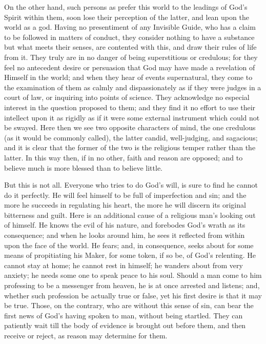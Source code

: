 On the other hand, such persons as prefer this world to the
leadings of God's Spirit within them, soon lose their perception of
the latter, and lean upon the world as a god. Having no presentiment
of any Invisible Guide, who has a claim to be followed in matters of
conduct, they consider nothing to have a substance but what meets
their senses, are contented with this, and draw their rules of life
from it. They truly are in no danger of being superstitious or
credulous; for they feel no antecedent desire or persuasion that God
may have made a revelation of Himself in the world; and when they hear
of events supernatural, they come to the examination of them as calmly
and dispassionately as if they were judges in a court of law, or
inquiring into points of science. They acknowledge no especial interest in the question proposed to them; and they find it no effort
to use their intellect upon it as rigidly as if it were some external
instrument which could not be swayed. Here then we see two opposite
characters of mind, the one credulous (as it would be commonly
called), the latter candid, well-judging, and sagacious; and it is
clear that the former of the two is the religious temper rather than
the latter. In this way then, if in no other, faith and reason are
opposed; and to believe much is more blessed than to believe little.

But this is not all. Everyone who tries to do God's will, is sure
to find he cannot do it perfectly. He will feel himself to be full of
imperfection and sin; and the more he succeeds in regulating his
heart, the more he will discern its original bitterness and guilt.
Here is an additional cause of a religious man's looking out of
himself. He knows the evil of his nature, and forebodes God's wrath as
its consequence; and when he looks around him, he sees it reflected
from within upon the face of the world. He fears; and, in consequence,
seeks about for some means of propitiating his Maker, for some token,
if so be, of God's relenting. He cannot stay at home; he cannot rest
in himself; he wanders about from very anxiety; he needs some one to
speak peace to his soul. Should a man come to him professing to be a
messenger from heaven, he is at once arrested and listens; and,
whether such profession be actually true or false, yet his first
desire is that it may be true. Those, on the contrary, who are without
this sense of sin, can bear the first news of God's having spoken to
man, without being startled. They can patiently wait till the body of
evidence is brought out before them, and then receive or reject, as
reason may determine for them.


